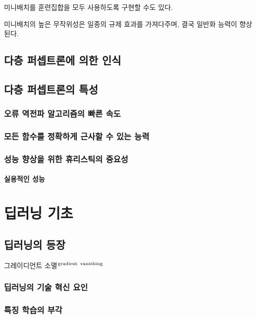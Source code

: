 \documentclass [12pt] {oblivoir}
\let\oldsubsubsection=\subsubsection
\renewcommand{\subsubsection}
{
  \filbreak
  \oldsubsubsection
}
\begin{document}
미니배치를 훈련집합을 모두 사용하도록 구현할 수도 있다.

미니배치의 높은 무작위성은 일종의 규제 효과를 가져다주며, 결국 일반화 능력이 향상된다.

\subsection{다층 퍼셉트론에 의한 인식}

\subsection{다층 퍼셉트론의 특성}

\subsubsection{오류 역전파 알고리즘의 빠른 속도}

\subsubsection{모든 함수를 정확하게 근사할 수 있는 능력}

\subsubsection{성능 향상을 위한 휴리스틱의 중요성}

\paragraph*{실용적인 성능}\mbox{}

\vspace{3mm}

\newpage
\section{딥러닝 기초}

\subsection{딥러닝의 등장}

그레이디언트 소멸$^{\text{gradient\, vanishing}}$

\subsubsection{딥러닝의 기술 혁신 요인}

\subsubsection{특징 학습의 부각}
\end{document}
